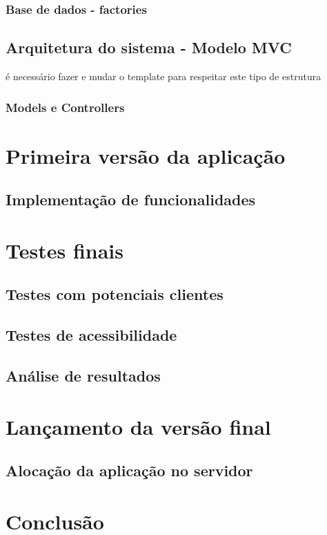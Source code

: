 \documentclass[11pt, twoside]{report}
\begin{document}
	
	\subsection{Base de dados - factories}
	\section{Arquitetura do sistema - Modelo MVC}
	é necessário fazer e mudar o template para respeitar este tipo de estrutura
	\subsection{Models e Controllers}
	
	\chapter{Primeira versão da aplicação}
	\section{Implementação de funcionalidades}
	
	\chapter{Testes finais}
	\section{Testes com potenciais clientes}
	\section{Testes de acessibilidade}
	\section{Análise de resultados}
	
	\chapter{Lançamento da versão final}
	\section{Alocação da aplicação no servidor}
	
	
	\chapter{Conclusão}
	
\end{document}
